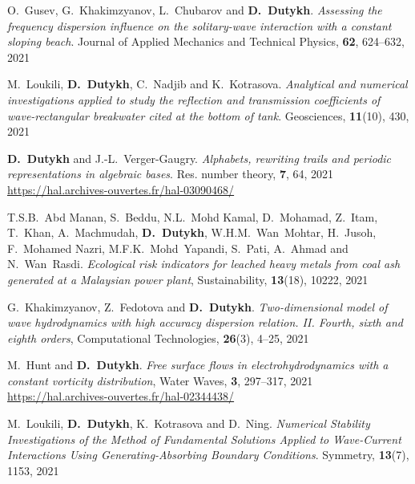 \begin{etaremune}
  
  \item O.~Gusev, G.~Khakimzyanov, L.~Chubarov and \textbf{D.~Dutykh}. \textit{Assessing the frequency dispersion influence on the solitary-wave interaction with a constant sloping beach}. Journal of Applied Mechanics and Technical Physics, \textbf{62}, 624--632, 2021 %
  
  \item M.~Loukili, \textbf{D.~Dutykh}, C.~Nadjib and K.~Kotrasova. \textit{Analytical and numerical investigations applied to study the reflection and transmission coefficients of wave-rectangular breakwater cited at the bottom of tank}. Geosciences, \textbf{11}(10), 430, 2021 %
  
  \item \textbf{D.~Dutykh} and J.-L.~Verger-Gaugry. \textit{Alphabets, rewriting trails and periodic representations in algebraic bases}. Res. number theory, \textbf{7}, 64, 2021 \\ %
  \url{https://hal.archives-ouvertes.fr/hal-03090468/}
  
  \item T.S.B.~Abd Manan, S.~Beddu, N.L.~Mohd Kamal, D.~Mohamad, Z.~Itam, T.~Khan, A.~Machmudah, \textbf{D.~Dutykh}, W.H.M.~Wan~Mohtar, H.~Jusoh, F.~Mohamed Nazri, M.F.K.~Mohd~Yapandi, S.~Pati, A.~Ahmad and N.~Wan~Rasdi. \textit{Ecological risk indicators for leached heavy metals from coal ash generated at a Malaysian power plant}, Sustainability, \textbf{13}(18), 10222, 2021 %
  
  \item G.~Khakimzyanov, Z.~Fedotova and \textbf{D.~Dutykh}. \textit{Two-dimensional model of wave hydrodynamics with high accuracy dispersion relation. II. Fourth, sixth and eighth orders}, Computational Technologies, \textbf{26}(3), 4--25, 2021 %
  
  \item M.~Hunt and \textbf{D.~Dutykh}. \textit{Free surface flows in electrohydrodynamics with a constant vorticity distribution}, Water Waves, \textbf{3}, 297--317, 2021 \\ %
  \url{https://hal.archives-ouvertes.fr/hal-02344438/}
  
  \item M.~Loukili, \textbf{D.~Dutykh}, K.~Kotrasova and D.~Ning. \textit{Numerical Stability Investigations of the Method of Fundamental Solutions Applied to Wave-Current Interactions Using Generating-Absorbing Boundary Conditions}. Symmetry, \textbf{13}(7), 1153, 2021 %
  

\end{etaremune}
